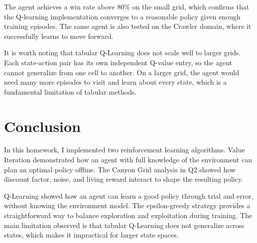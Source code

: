 \documentclass[11pt,a4paper]{article}
\begin{document}
The agent achieves a win rate above 80\% on the small grid, which confirms that the Q-learning implementation converges to a reasonable policy given enough training episodes. The same agent is also tested on the Crawler domain, where it successfully learns to move forward.

It is worth noting that tabular Q-Learning does not scale well to larger grids. Each state-action pair has its own independent Q-value entry, so the agent cannot generalize from one cell to another. On a larger grid, the agent would need many more episodes to visit and learn about every state, which is a fundamental limitation of tabular methods.

\section{Conclusion}

In this homework, I implemented two reinforcement learning algorithms. Value Iteration demonstrated how an agent with full knowledge of the environment can plan an optimal policy offline. The Canyon Grid analysis in Q2 showed how discount factor, noise, and living reward interact to shape the resulting policy.

Q-Learning showed how an agent can learn a good policy through trial and error, without knowing the environment model. The epsilon-greedy strategy provides a straightforward way to balance exploration and exploitation during training. The main limitation observed is that tabular Q-Learning does not generalize across states, which makes it impractical for larger state spaces.
\end{document}
